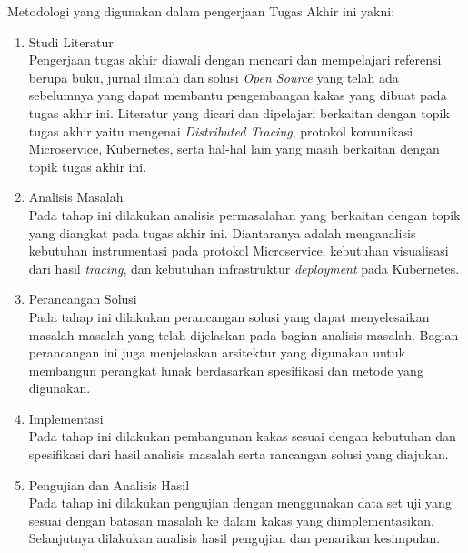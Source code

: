 Metodologi yang digunakan dalam pengerjaan Tugas Akhir ini yakni:
\begin{enumerate}
    \item Studi Literatur \\
          Pengerjaan tugas akhir diawali dengan mencari dan mempelajari referensi berupa buku, jurnal ilmiah dan solusi \textit{Open Source}  yang telah ada sebelumnya yang dapat membantu pengembangan kakas yang dibuat pada tugas akhir ini. Literatur yang dicari dan dipelajari berkaitan dengan topik tugas akhir yaitu mengenai \textit{Distributed Tracing},  protokol komunikasi Microservice, Kubernetes, serta hal-hal lain yang masih berkaitan dengan topik tugas akhir ini.

    \item Analisis Masalah \\
          Pada tahap ini dilakukan analisis permasalahan yang berkaitan dengan topik yang diangkat pada tugas akhir ini. Diantaranya adalah menganalisis kebutuhan instrumentasi pada protokol Microservice, kebutuhan visualisasi dari hasil \textit{tracing}, dan kebutuhan infrastruktur \textit{deployment} pada Kubernetes.

    \item Perancangan Solusi \\
          Pada tahap ini dilakukan perancangan solusi yang dapat menyelesaikan masalah-masalah yang telah dijelaskan pada bagian analisis masalah. Bagian perancangan ini juga menjelaskan arsitektur yang digunakan untuk membangun perangkat lunak berdasarkan spesifikasi dan metode yang digunakan.

    \item Implementasi \\
          Pada tahap ini dilakukan pembangunan kakas sesuai dengan kebutuhan dan spesifikasi dari hasil analisis masalah serta rancangan solusi yang diajukan.

    \item Pengujian dan Analisis Hasil \\
          Pada tahap ini dilakukan pengujian dengan menggunakan data set uji yang sesuai dengan batasan masalah ke dalam kakas yang diimplementasikan. Selanjutnya dilakukan analisis hasil pengujian dan penarikan kesimpulan.

\end{enumerate}

